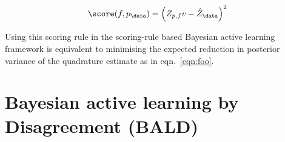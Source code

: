 \begin{equation}
	\score(f,p_\data) = \left(Z_{p,f}v - \hat{Z}_\data \right)^2
\end{equation}

Using this scoring rule in the scoring-rule based Bayesian active learning framework is equivalent to minimising the expected reduction in posterior variance of the quadrature estimate as in eqn.\ \eqref{eqn:foo}.

\section{Bayesian active learning by Disagreement (BALD)}